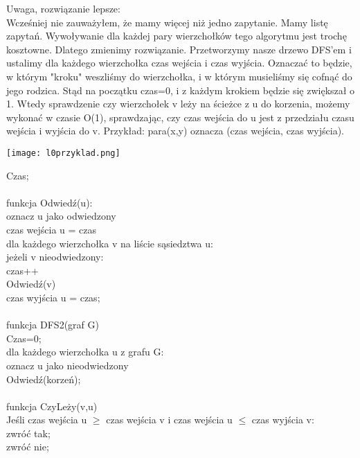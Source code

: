 \documentclass[a4paper]{article}
\begin{document}
Uwaga, rozwiązanie lepsze:\\
Wcześniej nie zauważyłem, że mamy więcej niż jedno zapytanie. Mamy listę zapytań. Wywoływanie dla każdej pary wierzchołków tego algorytmu jest trochę kosztowne. Dlatego zmienimy rozwiązanie. Przetworzymy nasze drzewo DFS'em i ustalimy dla każdego wierzchołka czas wejścia i czas wyjścia. Oznaczać to będzie, w którym "kroku" weszliśmy do wierzchołka, i w którym musieliśmy się cofnąć do jego rodzica. Stąd na początku czas=0, i z każdym krokiem będzie się zwiększał o 1. Wtedy sprawdzenie czy wierzchołek v leży na ścieżce z u do korzenia, możemy wykonać w czasie O(1), sprawdzając, czy czas wejścia do u jest z przedziału czasu wejścia i wyjścia do v. Przykład: para(x,y) oznacza (czas wejścia, czas wyjścia).\\
\begin{center}
\texttt{[image: l0przyklad.png]}\\
\end{center}
\clearpage
Czas;\\ \\
funkcja Odwiedź(u):\\
\hspace*{2ex}oznacz u jako odwiedzony\\
\hspace*{2ex}czas wejścia u = czas\\
\hspace*{2ex}dla każdego wierzchołka v na liście sąsiedztwa u:\\
\hspace*{4ex}jeżeli v nieodwiedzony:\\
\hspace*{6ex}czas++\\
\hspace*{6ex}Odwiedź(v)\\	
\hspace*{2ex}czas wyjścia u = czas;\\\\
funkcja DFS2(graf G)\\
\hspace*{2ex}Czas=0;\\
\hspace*{2ex}dla każdego wierzchołka u z grafu G:\\
\hspace*{4ex}oznacz u jako nieodwiedzony\\
\hspace*{2ex}Odwiedź(korzeń);\\\\
funkcja CzyLeży(v,u)\\
\hspace*{2ex}Jeśli czas wejścia u $\geq$ czas wejścia v i czas wejścia u $\leq$ czas wyjścia v:\\
\hspace*{4ex}zwróć tak;\\
\hspace*{2ex}zwróć nie;\\
\end{document}
